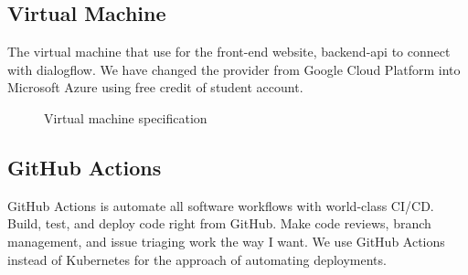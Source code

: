 \documentclass[12pt,oneside,openright,a4paper]{cpe-english-project}
\begin{document}
	\subsection{Virtual Machine}
		\begin{flushleft}
			The virtual machine that use for the front-end website, backend-api to connect with dialogflow. We have changed the provider from Google Cloud Platform into Microsoft Azure using free credit of student account.
		\end{flushleft}
		\begin{figure}[!h]\centering
			\caption{Virtual machine specification}\label{fig:Virtual machine specification}
		\end{figure}
	\pagebreak

	\subsection{GitHub Actions}
	\begin{flushleft}
		GitHub Actions is automate all software workflows with world-class CI/CD. Build, test, and deploy code right from GitHub. Make code reviews, branch management, and issue triaging work the way I want.\cite{GitHub_Actions}
		We use GitHub Actions instead of Kubernetes for the approach of automating deployments.
	\end{flushleft}
\end{document}
